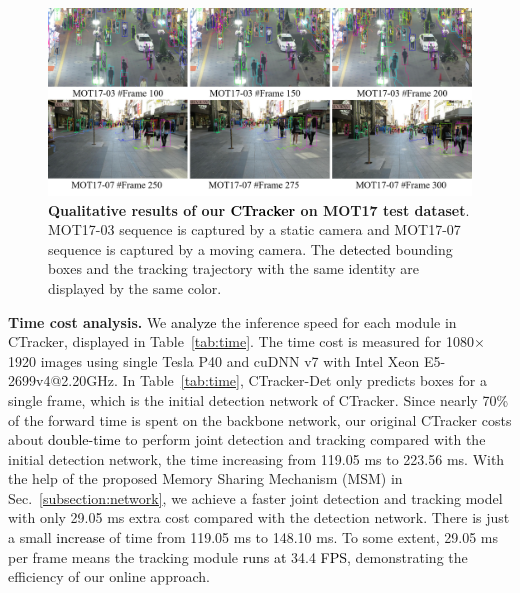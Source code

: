 \documentclass[../arXiv_main.tex]{subfiles}
\newcommand{\yang}[1]{\textcolor{black}{#1}}
\newcommand\CRwfb[1]{\textcolor{black}{#1}}
\newcommand{\CRyang}[1]{\textcolor{black}{#1}}
\begin{document}
\begin{figure}[t!]
\centering{}\includegraphics[width=0.98\columnwidth]{figure/result.png}
\caption{\label{fig:result}\textbf{Qualitative results of our \yang{CTracker} on MOT17 test dataset}. MOT17-03 sequence is captured by a static camera and MOT17-07 sequence is captured by a moving camera. The \CRwfb{detected} bounding boxes and the tracking trajectory with the same identity are displayed by the same color.}
\end{figure}

\begin{table}[t!]
\renewcommand\arraystretch{1.2}
\centering
\caption{\textbf{Time cost analysis of CTracker}.}\label{tab:time}

\scriptsize{
}
\end{table}

\noindent\textbf{Time cost analysis.} We \CRwfb{analyze} the inference speed for each module in CTracker, displayed in Table~\ref{tab:time}. The time cost is measured for 1080$\times$1920 images using single Tesla P40 and cuDNN v7 with Intel Xeon E5-2699v4@2.20GHz. In Table~\ref{tab:time}, CTracker-Det only predicts boxes for a single frame, which is the initial detection network of CTracker. Since nearly 70\% of the forward time is spent on the backbone network, our original CTracker costs about \CRwfb{double-time} to perform joint detection and tracking compared with the initial detection network, the time increasing from 119.05 ms to 223.56 ms. With the help of the proposed Memory Sharing Mechanism (MSM) in Sec.~\ref{subsection:network}, we achieve a faster joint detection and tracking model with only 29.05 ms extra cost compared with the detection network. There is just a small \CRwfb{increase} of time from 119.05 ms to 148.10 ms. To some extent, 29.05 ms per frame means the tracking module \CRyang{runs at} 34.4 \CRyang{FPS}, demonstrating the efficiency of our online approach.
\end{document}
